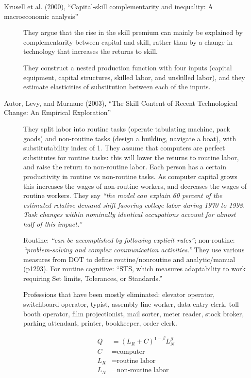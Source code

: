 \documentclass[
  11pt,
  letterpaper,
  DIV=11,
  numbers=noendperiod,
  oneside]{scrartcl}
\begin{document}
\begin{description}
\item[Krusell et al. (2000), ``Capital-skill complementarity and
inequality: A macroeconomic analysis'']
They argue that the rise in the skill premium can mainly be explained by
complementarity between capital and skill, rather than by a change in
technology that increases the returns to skill.

They construct a nested production function with four inputs (capital
equipment, capital structures, skilled labor, and unskilled labor), and
they estimate elasticities of substitution between each of the inputs.
\item[Autor, Levy, and Murnane (2003), ``The Skill Content of Recent
Technological Change: An Empirical Exploration'']
They split labor into routine tasks (operate tabulating machine, pack
goods) and non-routine tasks (design a building, navigate a boat), with
substitutability index of 1. They assume that computers are perfect
substitutes for routine tasks: this will lower the returns to routine
labor, and raise the return to non-routine labor. Each person has a
certain productivity in routine vs non-routine tasks. As computer
capital grows this increases the wages of non-routine workers, and
decreases the wages of routine workers. They say \emph{``the model can
explain 60 percent of the estimated relative demand shift favoring
college labor during 1970 to 1998. Task changes within nominally
identical occupations account for almost half of this impact.''}

Routine: \emph{``can be accomplished by following explicit rules''};
non-routine: \emph{``problem-solving and complex communication
activities.''} They use various measures from DOT to define
routine/nonroutine and analytic/manual (p1293). For routine cognitive:
``STS, which measures adaptability to work requiring Set limits,
Tolerances, or Standards.''

Professions that have been mostly eliminated: elevator operator,
switchboard operator, typist, assembly line worker, data entry clerk,
toll booth operator, film projectionist, mail sorter, meter reader,
stock broker, parking attendant, printer, bookkeeper, order clerk.

\[\begin{aligned}
  Q &=(L_R+C)^{1-\beta}L_N^\beta\\
  C &= \text{computer}\\
  L_R &= \text{routine labor}\\
  L_N &= \text{non-routine labor}
   \end{aligned}\]
\end{description}
\end{document}

